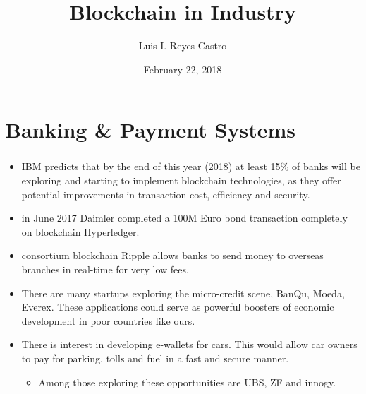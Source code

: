 \documentclass[ 10pt, xcolor = dvipsnames]{beamer}
\title[\shorttitle]{Blockchain in Industry}
\author[L. I. Reyes Castro]{Luis I. Reyes Castro}
\institute[BitCapital]{\normalsize Consultor at BitCapital}
\date[Feb-22-2018]{February 22, 2018}
\begin{document}

%


\section{Banking \& Payment Systems}
\begin{frame}[allowframebreaks]
\frametitle{\insertsection}

\begin{itemize}
\item IBM predicts that by the end of this year (2018) at least 15\% of banks will be exploring and starting to implement blockchain technologies, as they offer potential improvements in transaction cost, efficiency and security. 
\item \Eg in June 2017 Daimler completed a 100M Euro bond transaction completely on blockchain Hyperledger. 
\item \Eg consortium blockchain Ripple allows banks to send money to overseas branches in real-time for very low fees. 
\item There are many startups exploring the micro-credit scene, \eg BanQu, Moeda, Everex. These applications could serve as powerful boosters of economic development in poor countries like ours. 
\item There is interest in developing e-wallets for cars. This would allow car owners to pay for parking, tolls and fuel in a fast and secure manner. 
\begin{itemize}
\item Among those exploring these opportunities are UBS, ZF and innogy. 
\end{itemize}
\end{itemize}

\end{frame}

\end{document}
